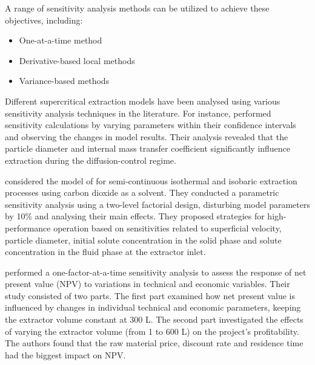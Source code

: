 \documentclass[a4paper,fleqn]{cas-dc}
\begin{document}
	A range of sensitivity analysis methods can be utilized to achieve these objectives, including:
	
	\begin{itemize}
		\item One-at-a-time method
		\item Derivative-based local methods
		\item Variance-based methods
	\end{itemize}
	
	Different supercritical extraction models have been analysed using various sensitivity analysis techniques in the literature. For instance, \citet{Fiori_2007} performed sensitivity calculations by varying parameters within their confidence intervals and observing the changes in model results. Their analysis revealed that the particle diameter and internal mass transfer coefficient significantly influence extraction during the diffusion-control regime.
	
	\citet{Santos2000} considered the model of \citet{Sovova1994} for semi-continuous isothermal and isobaric extraction processes using carbon dioxide as a solvent. They conducted a parametric sensitivity analysis using a two-level factorial design, disturbing model parameters by 10\% and analysing their main effects. They proposed strategies for high-performance operation based on sensitivities related to superficial velocity, particle diameter, initial solute concentration in the solid phase and solute concentration in the fluid phase at the extractor inlet.
	
	\citet{Hatami2024} performed a one-factor-at-a-time sensitivity analysis to assess the response of net present value (NPV) to variations in technical and economic variables. Their study consisted of two parts. The first part examined how net present value is influenced by changes in individual technical and economic parameters, keeping the extractor volume constant at 300 L. The second part investigated the effects of varying the extractor volume (from 1 to 600 L) on the project's profitability. The authors found that the raw material price, discount rate and residence time had the biggest impact on NPV.
	
\end{document}
